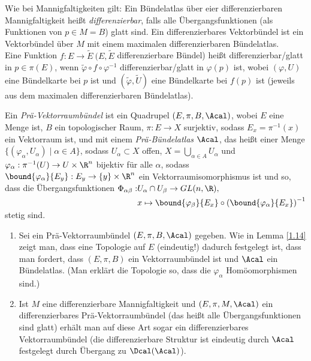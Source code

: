 \begin{defn*}
	Wie bei Mannigfaltigkeiten gilt: Ein Bündelatlas über eier differenzierbaren Mannigfaltigkeit heißt \emph{differenzierbar}, falls alle Übergangsfunktionen (als Funktionen von $p \in M = B$) glatt sind. Ein differenzierbares Vektorbündel ist ein Vektorbündel über $M$ mit einem maximalen differenzierbaren Bündelatlas.\\
	Eine Funktion $ f: E \to \tilde{E}\ (E,\tilde{E}$ differenzierbare Bündel) heißt differenzierbar/glatt in $p \in \pi(E)$, wenn $ \tilde{\varphi} \circ f \circ \varphi^{-1} $ differenzierbar/glatt in $\varphi(p)$ ist, wobei $(\varphi,U)$ eine Bündelkarte bei $p$ ist und $(\tilde{\varphi},\tilde{U})$ eine Bündelkarte bei $f(p)$ ist (jeweils aus dem maximalen differenzierbaren Bündelatlas). 
\end{defn*}

\begin{defn}  
	Ein \emph{Prä-Vektorraumbündel} ist ein Quadrupel $ (E,\pi,B,\Acal) $, wobei $E$ eine Menge ist, $B$ ein topologischer Raum, $\pi: E \to X$ surjektiv, sodass $E_x = \pi^{-1}(x)$ ein Vektorraum ist, und mit einem \emph{Prä-Bündelatlas} $\Acal$, das heißt einer Menge $ \{(\varphi_\alpha,U_\alpha) \mid \alpha \in A\} $, sodass $U_\alpha \subset X$ offen, $ X = \bigcup_{\alpha \in A} U_\alpha $ und $ \varphi_\alpha: \pi^{-1}(U) \to U \times \R^n $ bijektiv für alle $\alpha$, sodass $ \bound{\varphi_\alpha}{E_y}: E_y \to \{y\} \times \R^n $ ein Vektorraumisomorphismus ist und so, dass die Übergangsfunktionen 
	$ \begin{aligned}[t]
		\Phi_{\alpha \beta}: &U_\alpha \cap U_\beta \to GL(n,\R),\\
		 &x \mapsto \bound{\varphi_\beta}{E_x} \circ \left( \bound{\varphi_\alpha}{E_x} \right)^{-1}
	\end{aligned} $ stetig sind.
\end{defn}

\begin{rem}
	\begin{enumerate}[label= {\roman*})]
		\item Sei ein Prä-Vektorraumbündel $ (E,\pi,B,\Acal) $ gegeben. Wie in Lemma \ref{1.14} zeigt man, dass eine Topologie auf $E$ (eindeutig!) dadurch festgelegt ist, dass man fordert, dass $(E,\pi,B)$ ein Vektorraumbündel ist und $\Acal$ ein Bündelatlas. (Man erklärt die Topologie so, dass die $\varphi_\alpha$ Homöomorphismen sind.)
		\item Ist $M$ eine differenzierbare Mannigfaltigkeit und $ (E,\pi,M,\Acal) $ ein differenzierbares Prä-Vektorraumbündel (das heißt alle Übergangsfunktionen sind glatt) erhält man auf diese Art sogar ein differenzierbares Vektorraumbündel (die differenzierbare Struktur ist eindeutig durch $\Acal$ festgelegt durch Übergang zu $\Dcal(\Acal)$).
	\end{enumerate}
\end{rem}

